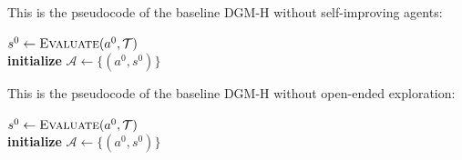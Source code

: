 \documentclass[]{fairmeta}
\begin{document}
This is the pseudocode of the baseline DGM-H without self-improving agents:

\begin{algorithm}[H]
\DontPrintSemicolon
\SetAlgoLined
{}
\BlankLine
$s^{0} \leftarrow \textsc{Evaluate}(a^{0}, \mathcal{T})$ \\
\textbf{initialize} $\mathcal{A} \leftarrow \{(a^{0}, s^{0})\}$ \\
\caption{DGM-H without self-improving agents (DGM w/o self-improve)}
\label{algo:DGM-H-wo-selfimprove}
\end{algorithm}

This is the pseudocode of the baseline DGM-H without open-ended exploration:

\begin{algorithm}[H]
\DontPrintSemicolon
\SetAlgoLined
{}
\BlankLine
$s^{0} \leftarrow \textsc{Evaluate}(a^{0}, \mathcal{T})$ \\
\textbf{initialize} $\mathcal{A} \leftarrow \{(a^{0}, s^{0})\}$ \\
\caption{DGM-H without open-ended exploration (DGM-H w/o open-ended exploration}
\label{algo:DGM-H-wo-openended}
\end{algorithm}
\end{document}
